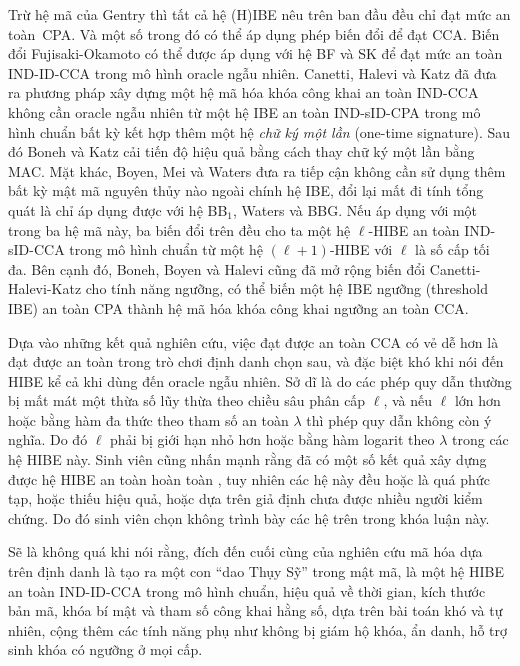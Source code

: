 \documentclass[class=report, crop=false]{standalone}
\begin{document}
		Trừ hệ mã của Gentry thì tất cả hệ (H)IBE nêu trên ban đầu đều chỉ đạt mức an toàn~CPA. Và một số trong đó có thể áp dụng phép biến đổi để đạt CCA. Biến đổi Fujisaki-Okamoto \cite{DBLP:conf/crypto/FujisakiO99} có thể được áp dụng với hệ BF và SK để đạt mức an toàn IND-ID-CCA trong mô hình oracle ngẫu nhiên. Canetti, Halevi và Katz \cite{DBLP:conf/eurocrypt/CanettiHK04} đã đưa ra phương pháp xây dựng một hệ mã hóa khóa công khai an toàn IND-CCA không cần oracle ngẫu nhiên từ một hệ IBE an toàn IND-sID-CPA trong mô hình chuẩn bất kỳ kết hợp thêm một hệ \textit{chữ ký một lần} (one-time signature). Sau đó Boneh và Katz \cite{DBLP:conf/ctrsa/BonehK05} cải tiến độ hiệu quả bằng cách thay chữ ký một lần bằng MAC. Mặt khác, Boyen, Mei và Waters \cite{DBLP:conf/ccs/BoyenMW05} đưa ra tiếp cận không cần sử dụng thêm bất kỳ mật mã nguyên thủy nào ngoài chính hệ IBE, đổi lại mất đi tính tổng quát là chỉ áp dụng được với hệ BB$_1$, Waters và BBG. Nếu áp dụng với một trong ba hệ mã này, ba biến đổi trên đều cho ta một hệ $\ell$-HIBE an toàn IND-sID-CCA trong mô hình chuẩn từ một hệ $(\ell + 1)$-HIBE với $\ell$ là số cấp tối đa. Bên cạnh đó, Boneh, Boyen và Halevi \cite{DBLP:conf/ctrsa/BonehBH06} cũng đã mở rộng biến đổi Canetti-Halevi-Katz cho tính năng ngưỡng, có thể biến một hệ IBE ngưỡng (threshold IBE) an toàn CPA thành hệ mã hóa khóa công khai ngưỡng an toàn CCA.

		Dựa vào những kết quả nghiên cứu, việc đạt được an toàn CCA có vẻ dễ hơn là đạt được an toàn trong trò chơi định danh chọn sau, và đặc biệt khó khi nói đến HIBE kể cả khi dùng đến oracle ngẫu nhiên. Sở dĩ là do các phép quy dẫn thường bị mất mát một thừa số lũy thừa theo chiều sâu phân cấp $\ell$, và nếu $\ell$ lớn hơn hoặc bằng hàm đa thức theo tham số an toàn $\lambda$ thì phép quy dẫn không còn ý nghĩa. Do đó $\ell$ phải bị giới hạn nhỏ hơn hoặc bằng hàm logarit theo $\lambda$ trong các hệ HIBE này. Sinh viên cũng nhấn mạnh rằng đã có một số kết quả xây dựng được hệ HIBE an toàn hoàn toàn \cite{DBLP:conf/tcc/GentryH09, DBLP:conf/crypto/Waters09, DBLP:conf/tcc/LewkoW10, DBLP:journals/jise/HuWXY14}, tuy nhiên các hệ này đều hoặc là quá phức tạp, hoặc thiếu hiệu quả, hoặc dựa trên giả định chưa được nhiều người kiểm chứng. Do đó sinh viên chọn không trình bày các hệ trên trong khóa luận này.
		
		Sẽ là không quá khi nói rằng, đích đến cuối cùng của nghiên cứu mã hóa dựa trên định danh là tạo ra một con ``dao Thụy Sỹ'' trong mật mã, là một hệ HIBE an toàn IND-ID-CCA trong mô hình chuẩn, hiệu quả về thời gian, kích thước bản mã, khóa bí mật và tham số công khai hằng số, dựa trên bài toán khó và tự nhiên, cộng thêm các tính năng phụ như không bị giám hộ khóa, ẩn danh, hỗ trợ sinh khóa có ngưỡng ở mọi cấp.
\end{document}
